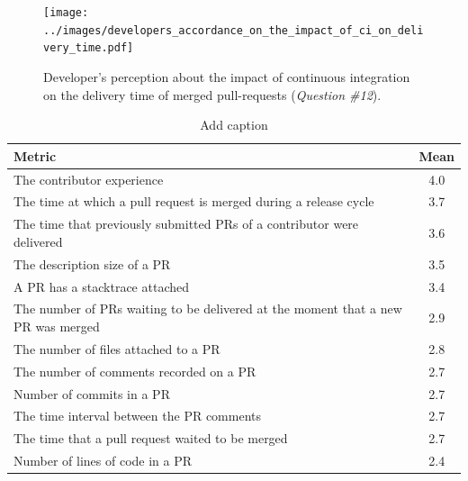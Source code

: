 	\begin{figure}[H]
		\texttt{[image: ../images/developers\_accordance\_on\_the\_impact\_of\_ci\_on\_delivery\_time.pdf]}
		\caption{Developer's perception about the impact of continuous integration on the delivery time of merged pull-requests (\textit{Question \#12}).}
		\label{fig:developer_perception_about_impact_of_ci_on_delivery_time}       %
	\end{figure}



\begin{table}[htbp]
  \centering
  \caption{Add caption}
    \begin{tabular}{lc}
    \toprule
    \textbf{Metric} & \textbf{Mean} \\
    \midrule
    The contributor experience & 4.0 \\
    The time at which a pull request is merged during a release cycle & 3.7 \\
    The time that previously submitted PRs of a contributor were delivered & 3.6 \\
    The description size of a PR & 3.5 \\
    A PR has a stacktrace attached & 3.4 \\
    The number of PRs waiting to be delivered at the moment that a new PR was merged & 2.9 \\
    The number of files attached to a PR & 2.8 \\
    The number of comments recorded on a PR & 2.7 \\
    Number of commits in a PR & 2.7 \\
    The time interval between the PR comments & 2.7 \\
    The time that a pull request waited to be merged & 2.7 \\
    Number of lines of code in a PR & 2.4 \\
    \bottomrule
    \end{tabular}%
  \label{tab:addlabel}%
\end{table}%

